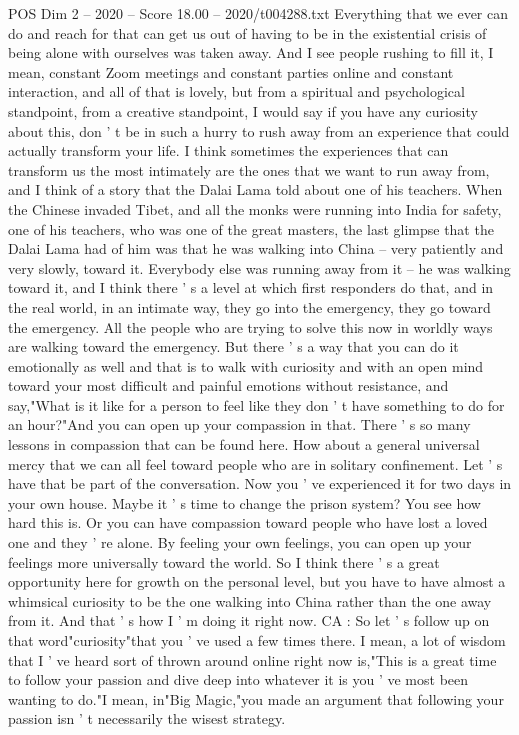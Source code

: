 \begin{textsample}{POS Dim 2 – 2020 – Score 18.00 – 2020/t004288.txt}
Everything that we ever can do and reach for that can get us out of having to be in the existential crisis of being alone with ourselves was taken away.
And I see people rushing to fill it, I mean, constant Zoom meetings and constant parties online and constant interaction, and all of that is lovely, but from a spiritual and psychological standpoint, from a creative standpoint, I would say if you have any curiosity about this, don ' t be in such a hurry to rush away from an experience that could actually transform your life.
I think sometimes the experiences that can transform us the most intimately are the ones that we want to run away from, and I think of a story that the Dalai Lama told about one of his teachers.
When the Chinese invaded Tibet, and all the monks were running into India for safety, one of his teachers, who was one of the great masters, the last glimpse that the Dalai Lama had of him was that he was walking into China -- very patiently and very slowly, toward it.
Everybody else was running away from it -- he was walking toward it, and I think there ' s a level at which first responders do that, and in the real world, in an intimate way, they go into the emergency, they go toward the emergency.
All the people who are trying to solve this now in worldly ways are walking toward the emergency.
But there ' s a way that you can do it emotionally as well and that is to walk with curiosity and with an open mind toward your most difficult and painful emotions without resistance, and say,"What is it like for a person to feel like they don ' t have something to do for an hour?"And you can open up your compassion in that.
There ' s so many lessons in compassion that can be found here.
How about a general universal mercy that we can all feel toward people who are in solitary confinement.
Let ' s have that be part of the conversation.
Now you ' ve experienced it for two days in your own house.
Maybe it ' s time to change the prison system?
You see how hard this is.
Or you can have compassion toward people who have lost a loved one and they ' re alone.
By feeling your own feelings, you can open up your feelings more universally toward the world.
So I think there ' s a great opportunity here for growth on the personal level, but you have to have almost a whimsical curiosity to be the one walking into China rather than the one away from it.
And that ' s how I ' m doing it right now.
CA : So let ' s follow up on that word"curiosity"that you ' ve used a few times there.
I mean, a lot of wisdom that I ' ve heard sort of thrown around online right now is,"This is a great time to follow your passion and dive deep into whatever it is you ' ve most been wanting to do."I mean, in"Big Magic,"you made an argument that following your passion isn ' t necessarily the wisest strategy.

\end{textsample}
